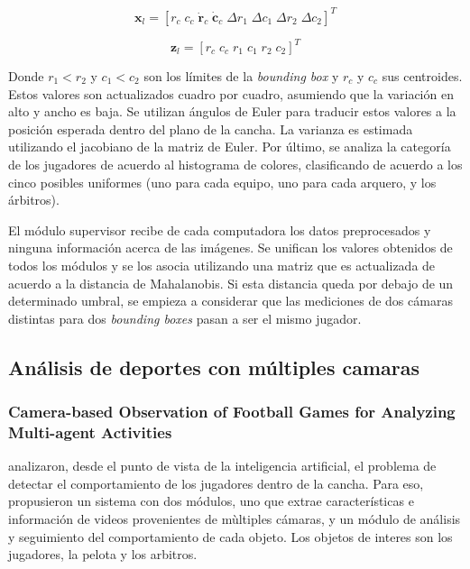 \documentclass[a4paper,10pt]{article}
\begin{document}
\[
\mathbf{x}_l = [r_c \; c_c \;  \mathbf{\dot r}_c  \; \mathbf{\dot c}_c \;  \Delta r_1  \; \Delta c_1 \;  \Delta r_2 \;  \Delta c_2]^T
\]

\[
\mathbf{z}_l = [r_c \;  c_c  \; r_1  \; c_1  \; r_2  \; c_2]^T
\]

Donde $r_1 < r_2$ y $c_1 < c_2$ son los límites de la \textit{bounding box} y
$r_c$ y $c_c$ sus centroides. Estos valores son
actualizados cuadro por cuadro, asumiendo que la variación en alto y ancho es
baja. Se utilizan ángulos de Euler para traducir estos valores a la posición
esperada dentro del plano de la cancha. La varianza es estimada utilizando el
jacobiano de la matriz de Euler. Por último, se analiza la categoría de los
jugadores de acuerdo al histograma de colores, clasificando de acuerdo a los
cinco posibles uniformes (uno para cada equipo, uno para cada arquero, y los
árbitros).

El módulo supervisor recibe de cada computadora los datos preprocesados y
ninguna información acerca de las imágenes. Se unifican los valores obtenidos
de todos los módulos y se los asocia utilizando una matriz que es actualizada
de acuerdo a la distancia de Mahalanobis. Si esta distancia queda por debajo de
un determinado umbral, se empieza a considerar que las mediciones de dos
cámaras distintas para dos \textit{bounding boxes} pasan a ser el mismo
jugador.

\subsection{Análisis de deportes con múltiples camaras}
\label{sec:var-camaras}

\subsubsection{Camera-based Observation of Football Games for Analyzing Multi-agent Activities}

\citeauthor*{beetz-05} analizaron, desde el punto de vista de la inteligencia
artificial, el problema de detectar el comportamiento de los jugadores dentro
de la cancha. Para eso, propusieron un sistema con dos módulos, uno que extrae
características e información de videos provenientes de mùltiples cámaras, y
un módulo de análisis y seguimiento del comportamiento de cada objeto.
Los objetos de interes son los jugadores, la pelota y los arbitros.
\end{document}
